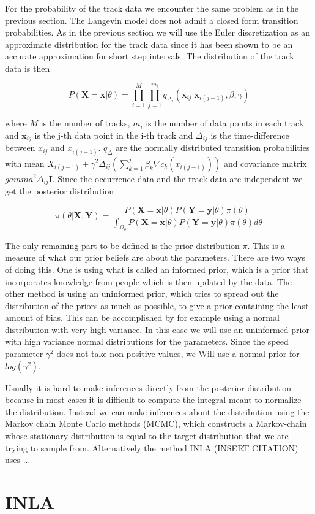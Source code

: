 For the probability of the track data we encounter the same problem as in the previous section. The Langevin model does not admit a closed form transition probabilities. As in the previous section we will use the Euler discretization as an approximate distribution for the track data since it has been shown to be an accurate approximation for short step intervals. The distribution of the track data is then

\begin{equation}
    P(\textbf{X} = \textbf{x}|\theta) = \prod_{i=1}^M \prod_{j=1}^{m_i} q_{\Delta_i}(\textbf{x}_{ij}|\textbf{x}_{i(j-1)}, \beta, \gamma)
\end{equation}
    
where $M$ is the number of tracks, $m_i$ is the number of data points in each track and $\textbf{x}_{ij}$ is the j-th data point in the i-th track and $\Delta_{ij}$ is the time-difference between $x_{ij}$ and $x_{i(j-1)}$. $q_{\Delta}$ are the normally distributed transition probabilities with mean $X_{i(j-1)} + \gamma^2\Delta_{ij}(\sum_{k = 1}^j \beta_k \nabla c_k(x_{i(j-1)}))$ and covariance matrix $gamma^2\Delta_{ij} \textbf{I}$. Since the occurrence data and the track data are independent we get the posterior distribution 


\begin{equation}
    \pi(\theta|\textbf{X}, \textbf{Y}) = \frac{P(\textbf{X} = \textbf{x}|\theta)P(\textbf{Y} = \textbf{y}|\theta)\pi(\theta)}{\int_{\Omega_\theta} P(\textbf{X} = \textbf{x}|\theta)P(\textbf{Y} = \textbf{y}|\theta)\pi(\theta)d\theta}
\end{equation}

The only remaining part to be defined is the prior distribution $\pi$. This is a measure of what our prior beliefs are about the parameters. There are two ways of doing this. One is using what is called an informed prior, which is a prior that incorporates knowledge from people which is then updated by the data. The other method is using an uninformed prior, which tries to spread out the distribution of the priors as much as possible, to give a prior containing the least amount of bias. This can be accomplished by for example using a normal distribution with very high variance. In this case we will use an uninformed prior with high variance normal distributions for the parameters. Since the speed parameter $\gamma^2$ does not take non-positive values, we Will use a normal prior for $log(\gamma^2)$.

Usually it is hard to make inferences directly from the posterior distribution because in most cases it is difficult to compute the integral meant to normalize the distribution. Instead we can make inferences about the distribution using the Markov chain Monte Carlo methods (MCMC), which constructs a Markov-chain whose stationary distribution is equal to the target distribution that we are trying to sample from. Alternatively the method INLA (INSERT CITATION) uses ...
















\section{INLA}